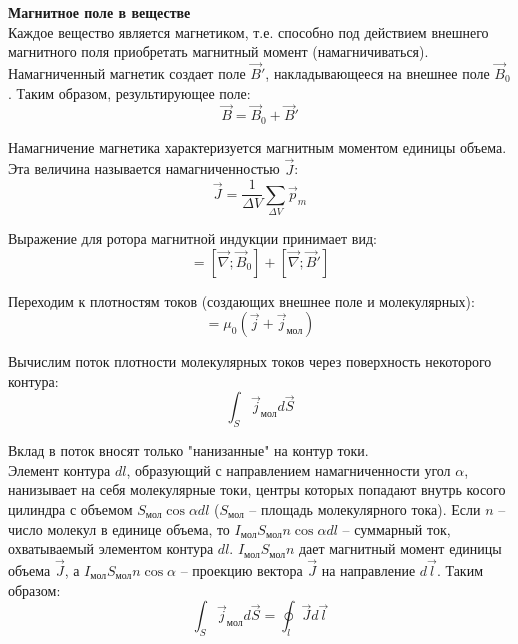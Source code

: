 \documentclass{article}
\begin{document}
	
	\textbf{Магнитное поле в веществе}\\

	Каждое вещество является магнетиком, т.е. способно под действием внешнего магнитного поля приобретать магнитный момент (намагничиваться). Намагниченный магнетик создает поле $\vec B'$, накладывающееся на внешнее поле $\vec B_0$. Таким образом, результирующее поле:
	\begin{equation}
		\vec B = \vec B_0 + \vec B'
	\end{equation}

	Намагничение магнетика характеризуется магнитным моментом единицы объема. Эта величина называется намагниченностью $\vec J$:
	\begin{equation}
		\vec J = \frac{1}{\Delta V}\sum_{\Delta V}\vec p_m
	\end{equation}

	Выражение для ротора магнитной индукции принимает вид:
	\begin{equation}
		[\vec\nabla;\vec B] = [\vec\nabla;\vec B_0] + [\vec\nabla;\vec B']
	\end{equation}

	Переходим к плотностям токов (создающих внешнее поле и молекулярных):
	\begin{equation}
		[\vec\nabla;\vec B] = \mu_0(\vec j + \vec j_\text{мол})
	\end{equation}

	Вычислим поток плотности молекулярных токов через поверхность некоторого контура:
	\begin{equation}
		\int_S \vec j_\text{мол} d\vec S
	\end{equation}

	Вклад в поток вносят только "нанизанные" на контур токи.\\

	Элемент контура $dl$, образующий с направлением намагниченности угол $\alpha$, нанизывает на себя молекулярные токи, центры которых попадают внутрь косого цилиндра с объемом $S_\text{мол}\cos\alpha dl$ ($S_\text{мол}$ -- площадь молекулярного тока). Если $n$ -- число молекул в единице объема, то $I_\text{мол}S_\text{мол}n\cos\alpha dl$ -- суммарный ток, охватываемый элементом контура $dl$. $I_\text{мол}S_\text{мол}n$ дает магнитный момент единицы объема $\vec J$, а $I_\text{мол}S_\text{мол}n\cos\alpha$ -- проекцию вектора $\vec J$ на направление $d\vec l$. Таким образом:
	\begin{equation}
		\int_S \vec j_\text{мол}d\vec S = \oint_l \vec J d\vec l
	\end{equation}
\end{document}
